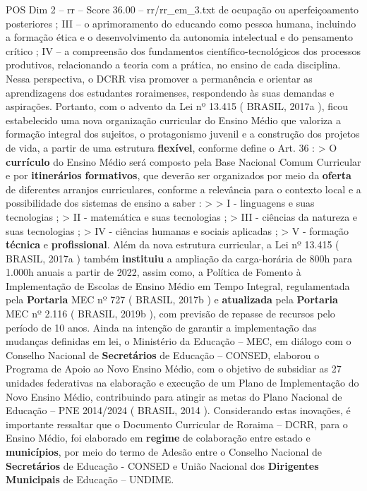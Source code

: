 \begin{textsample}{POS Dim 2 – rr – Score 36.00 – rr/rr\_em\_3.txt}  \label{ex:f2_pos_103}
de ocupação ou aperfeiçoamento posteriores ; III – o aprimoramento do educando como pessoa humana, incluindo a formação ética e o desenvolvimento da autonomia intelectual e do pensamento crítico ; IV – a compreensão dos fundamentos científico-tecnológicos dos processos produtivos, relacionando a teoria com a prática, no ensino de cada disciplina.
Nessa perspectiva, o DCRR visa promover a permanência e orientar as aprendizagens dos estudantes roraimenses, respondendo às suas demandas e aspirações.
Portanto, com o advento da Lei nº 13.415 ( BRASIL, 2017a ), ficou estabelecido uma nova organização curricular do Ensino Médio que valoriza a formação integral dos sujeitos, o protagonismo juvenil e a construção dos projetos de vida, a partir de uma estrutura \textbf{flexível}, conforme define o Art. 36 : > O \textbf{currículo} do Ensino Médio será composto pela Base Nacional Comum Curricular e por \textbf{itinerários} \textbf{formativos}, que deverão ser organizados por meio da \textbf{oferta} de diferentes arranjos curriculares, conforme a relevância para o contexto local e a possibilidade dos sistemas de ensino a saber : > > I - linguagens e suas tecnologias ; > II - matemática e suas tecnologias ; > III - ciências da natureza e suas tecnologias ; > IV - ciências humanas e sociais aplicadas ; > V - formação \textbf{técnica} e \textbf{profissional}.
Além da nova estrutura curricular, a Lei nº 13.415 ( BRASIL, 2017a ) também \textbf{instituiu} a ampliação da carga-horária de 800h para 1.000h anuais a partir de 2022, assim como, a Política de Fomento à Implementação de Escolas de Ensino Médio em Tempo Integral, regulamentada pela \textbf{Portaria} MEC nº 727 ( BRASIL, 2017b ) e \textbf{atualizada} pela \textbf{Portaria} MEC nº 2.116 ( BRASIL, 2019b ), com previsão de repasse de recursos pelo período de 10 anos.
Ainda na intenção de garantir a implementação das mudanças definidas em lei, o Ministério da Educação – MEC, em diálogo com o Conselho Nacional de \textbf{Secretários} de Educação – CONSED, elaborou o Programa de Apoio ao Novo Ensino Médio, com o objetivo de subsidiar as 27 unidades federativas na elaboração e execução de um Plano de Implementação do Novo Ensino Médio, contribuindo para atingir as metas do Plano Nacional de Educação – PNE 2014/2024 ( BRASIL, 2014 ).
Considerando estas inovações, é importante ressaltar que o Documento Curricular de Roraima – DCRR, para o Ensino Médio, foi elaborado em \textbf{regime} de colaboração entre estado e \textbf{municípios}, por meio do termo de Adesão entre o Conselho Nacional de \textbf{Secretários} de Educação - CONSED e União Nacional dos \textbf{Dirigentes} \textbf{Municipais} de Educação – UNDIME.

\end{textsample}
